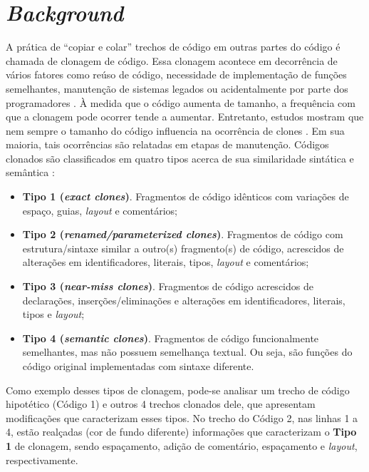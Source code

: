 \section{\textit{Background}}
A prática de ``copiar e colar'' trechos de código em outras partes do código é chamada de clonagem de código. Essa clonagem acontece em decorrência de vários fatores como reúso de código, necessidade de implementação de funções semelhantes, manutenção de sistemas legados ou acidentalmente por parte dos programadores \cite{solanki2016comparative}. À medida que o código aumenta de tamanho, a frequência com que a clonagem pode ocorrer tende a aumentar. Entretanto, estudos mostram que nem sempre o tamanho do código influencia na ocorrência de clones \cite{Torres2017}. Em sua maioria, tais ocorrências são relatadas em etapas de manutenção. Códigos clonados são classificados em quatro tipos acerca de sua similaridade sintática e semântica \cite{gautam2016various}\cite{solanki2016comparative}:

\begin{itemize}
	\item \textbf{Tipo 1 (\textit{exact clones})}. Fragmentos de código idênticos com variações de espaço, guias, \textit{layout} e comentários;
	
	\item \textbf{Tipo 2 (\textit{renamed/parameterized clones})}. Fragmentos de código com estrutura/sintaxe similar a outro(s) fragmento(s) de código, acrescidos de alterações em identificadores, literais, tipos, \textit{layout} e comentários;
	
	\item \textbf{Tipo 3 (\textit{near-miss clones})}. Fragmentos de código acrescidos de declarações, inserções/eliminações e alterações em identificadores, literais, tipos e \textit{layout};
	
	\item \textbf{Tipo 4 (\textit{semantic clones})}. Fragmentos de código funcionalmente semelhantes, mas não possuem semelhança textual. Ou seja, são funções do código original implementadas com sintaxe diferente.
\end{itemize}

Como exemplo desses tipos de clonagem, pode-se analisar um trecho de código hipotético (Código 1) e outros 4 trechos clonados dele, que apresentam modificações que caracterizam esses tipos. No trecho do Código 2, nas linhas 1 a 4, estão realçadas (cor de fundo diferente) informações que caracterizam o \textbf{Tipo 1} de clonagem, sendo espaçamento, adição de comentário, espaçamento e \textit{layout}, respectivamente.\\


